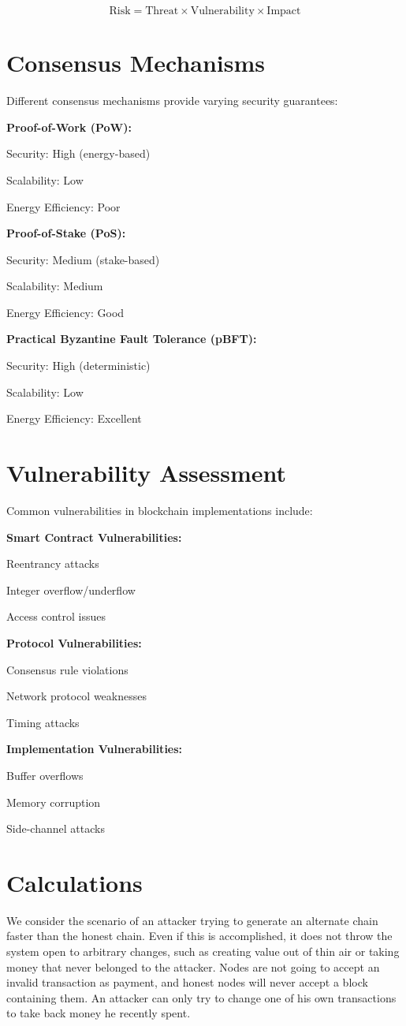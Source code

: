\documentclass{article}
\begin{document}
{\begin{equation}
\text{Risk} = \text{Threat} \times \text{Vulnerability} \times \text{Impact}
\end{equation}

\section{Consensus Mechanisms}
Different consensus mechanisms provide varying security guarantees:

\textbf{Proof-of-Work (PoW):}
\item Security: High (energy-based)
\item Scalability: Low
\item Energy Efficiency: Poor

\textbf{Proof-of-Stake (PoS):}
\item Security: Medium (stake-based)
\item Scalability: Medium
\item Energy Efficiency: Good

\textbf{Practical Byzantine Fault Tolerance (pBFT):}
\item Security: High (deterministic)
\item Scalability: Low
\item Energy Efficiency: Excellent

\section{Vulnerability Assessment}
Common vulnerabilities in blockchain implementations include:

\textbf{Smart Contract Vulnerabilities:}
\item Reentrancy attacks
\item Integer overflow/underflow
\item Access control issues

\textbf{Protocol Vulnerabilities:}
\item Consensus rule violations
\item Network protocol weaknesses
\item Timing attacks

\textbf{Implementation Vulnerabilities:}
\item Buffer overflows
\item Memory corruption
\item Side-channel attacks

\section{Calculations}
We consider the scenario of an attacker trying to generate an alternate chain faster than the honest chain. Even if this is accomplished, it does not throw the system open to arbitrary changes, such as creating value out of thin air or taking money that never belonged to the attacker. Nodes are not going to accept an invalid transaction as payment, and honest nodes will never accept a block containing them. An attacker can only try to change one of his own transactions to take back money he recently spent.

}
\end{document}
